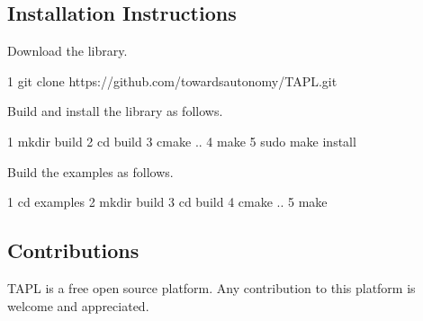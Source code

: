 \subsection*{Installation Instructions}


\begin{DoxyItemize}
\item Download the library.
\end{DoxyItemize}


\begin{DoxyCode}
1 git clone https://github.com/towardsautonomy/TAPL.git
\end{DoxyCode}



\begin{DoxyItemize}
\item Build and install the library as follows.
\end{DoxyItemize}


\begin{DoxyCode}
1 mkdir build  
2 cd build
3 cmake ..
4 make
5 sudo make install
\end{DoxyCode}



\begin{DoxyItemize}
\item Build the examples as follows.
\end{DoxyItemize}


\begin{DoxyCode}
1 cd examples
2 mkdir build
3 cd build
4 cmake ..
5 make
\end{DoxyCode}


\subsection*{Contributions}

T\+A\+PL is a free open source platform. Any contribution to this platform is welcome and appreciated. 